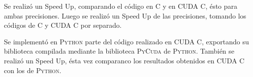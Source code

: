 Se realizó un Speed Up, comparando el código en \textsc{C} y en \textsc{CUDA C}, ésto para ambas precisiones. Luego se realizó un Speed Up de las precisiones, tomando los códigos de \textsc{C} y \textsc{CUDA C} por separado.

Se implementó en \textsc{Python} parte del código realizado en \textsc{CUDA C}, exportando su biblioteca compilada mediante la biblioteca \textsc{PyCuda} de \textsc{Python}. También se realizó un Speed Up, ésta vez comparanco los resultados obtenidos en \textsc{CUDA C} con los de \textsc{Python}.


